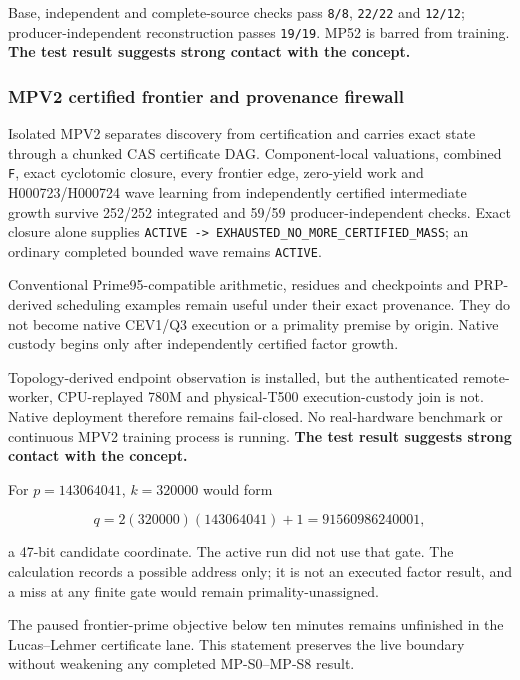 Base, independent and complete-source checks pass \texttt{8/8},
\texttt{22/22} and \texttt{12/12}; producer-independent reconstruction
passes \texttt{19/19}. MP52 is barred from training. \textbf{The test
result suggests strong contact with the concept.}

\subsubsection{MPV2 certified frontier and provenance
firewall}\label{viii-ch10-mpv2-certified-frontier-and-provenance-firewall}

Isolated MPV2 separates discovery from certification and carries exact
state through a chunked CAS certificate DAG. Component-local valuations,
combined \texttt{F}, exact cyclotomic closure, every frontier edge,
zero-yield work and H000723/H000724 wave learning from independently
certified intermediate growth survive 252/252 integrated and 59/59
producer-independent checks. Exact closure alone supplies
\texttt{ACTIVE\ -\textgreater{}\ \nolinkurl{EXHAUSTED_NO_MORE_CERTIFIED}\_MASS};
an ordinary completed bounded wave remains \texttt{ACTIVE}.

Conventional Prime95-compatible arithmetic, residues and checkpoints and
PRP-derived scheduling examples remain useful under their exact
provenance. They do not become native CEV1/Q3 execution or a primality
premise by origin. Native custody begins only after independently
certified factor growth.

Topology-derived endpoint observation is installed, but the
authenticated remote-worker, CPU-replayed 780M and physical-T500
execution-custody join is not. Native deployment therefore remains
fail-closed. No real-hardware benchmark or continuous MPV2 training
process is running. \textbf{The test result suggests strong contact with
the concept.}

For \(p=143064041\), \(k=320000\) would form

\[
q=2(320000)(143064041)+1=91560986240001,
\]

a 47-bit candidate coordinate. The active run did not use that gate. The
calculation records a possible address only; it is not an executed
factor result, and a miss at any finite gate would remain
primality-unassigned.

The paused frontier-prime objective below ten minutes remains unfinished
in the Lucas--Lehmer certificate lane. This statement preserves the live
boundary without weakening any completed MP-S0--MP-S8 result.

